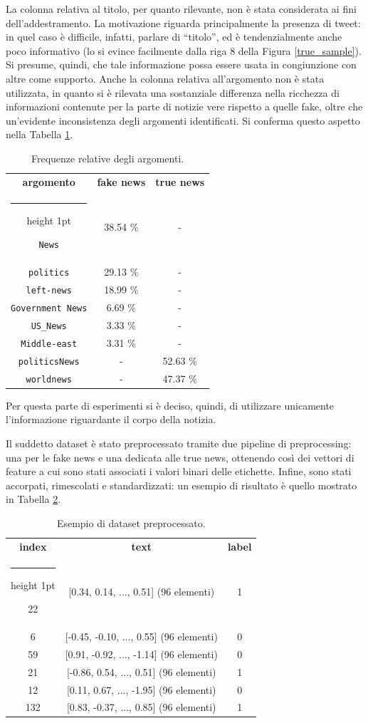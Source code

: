 \documentclass[12pt]{report}
\makeatletter
\theoremstyle{definition}
\newcommand{\thickhline}{%
    \noalign {\ifnum 0=`}\fi \hrule height 1pt
    \futurelet \reserved@a \@xhline
}
\makeatother
\begin{document}
La colonna relativa al titolo, per quanto rilevante, non è stata considerata ai fini dell'addestramento. La motivazione riguarda principalmente la presenza di tweet: in quel caso è difficile, infatti, parlare di ``titolo'', ed è tendenzialmente anche poco informativo (lo si evince facilmente dalla riga 8 della Figura \ref{true_sample}). Si presume, quindi, che tale informazione possa essere usata in congiunzione con altre come supporto.
Anche la colonna relativa all'argomento non è stata utilizzata, in quanto si è rilevata una sostanziale differenza nella ricchezza di informazioni contenute per la parte di notizie vere rispetto a quelle fake, oltre che un'evidente inconsistenza degli argomenti identificati. Si conferma questo aspetto nella Tabella \ref{subject}.
\begin{table}[!h]
\centering
 \begin{tabular}{|c|c|c|} 
 \hline 
 \textbf{argomento} & \textbf{fake news} & \textbf{true news}
\\ [0.5ex] 
 \thickhline
\texttt{News} & 38.54 \% & - \\
\texttt{politics} & 29.13 \% & -\\ 
\texttt{left-news} & 18.99 \% & -\\
\texttt{Government News} & 6.69 \% & -\\
\texttt{US\_News} & 3.33 \% & -\\
\texttt{Middle-east} & 3.31 \% & -\\
\texttt{politicsNews} & - & 52.63 \% \\
\texttt{worldnews} & - & 47.37 \% \\
 \hline
\end{tabular}
\caption{Frequenze relative degli argomenti.}
\label{subject}
\end{table}
Per questa parte di esperimenti si è deciso, quindi, di utilizzare unicamente l'informazione riguardante il corpo della notizia. 

Il suddetto dataset è stato preprocessato tramite due pipeline di preprocessing: una per le fake news e una dedicata alle true news, ottenendo così dei vettori di feature a cui sono stati associati i valori binari delle etichette.
Infine, sono stati accorpati, rimescolati e standardizzati: un esempio di risultato è quello mostrato in Tabella \ref{preprocesseddata}.
\begin{table}[!h]
\centering
 \begin{tabular}{|c|c|c|} 
 \hline 
 \textbf{index} & \textbf{text} & \textbf{label}
\\ [0.5ex] 
 \thickhline
22 & [0.34, 0.14, ..., 0.51] (96 elementi) & 1 \\
6 & [-0.45, -0.10, ..., 0.55] (96 elementi) & 0 \\ 
59 & [0.91, -0.92, ..., -1.14] (96 elementi) & 0\\
21 & [-0.86, 0.54, ..., 0.51] (96 elementi) & 1\\
12 & [0.11, 0.67, ..., -1.95] (96 elementi) & 0\\
132 & [0.83, -0.37, ..., 0.85] (96 elementi) & 1\\
 \hline
\end{tabular}
\caption{Esempio di dataset preprocessato.}
\label{preprocesseddata}
\end{table}
\end{document}
